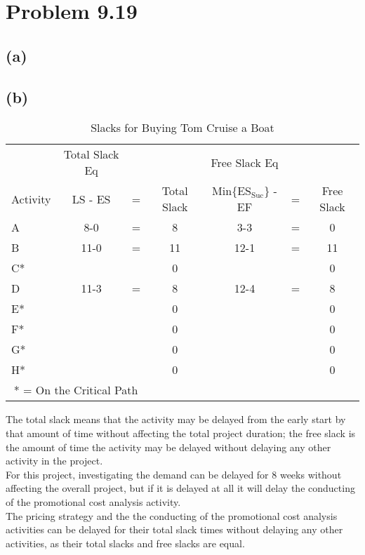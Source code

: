 \documentclass{article}
\begin{document}
	\section*{Problem 9.19}
	\subsection*{(a)}
	\begin{center}
	\makebox[\textwidth]{
		}
	\end{center}
	\pagebreak
	\subsection*{(b)}
	{\renewcommand{\arraystretch}{1.2} 
	\begin{table}[h!tbp]
  		\begin{center}
    		\caption{Slacks for Buying Tom Cruise a Boat}
    		\label{tab:table2}
			
    		\begin{tabular}{lcccccc}
				 & Total Slack Eq &  &  & Free Slack Eq & &\\
				Activity & LS - ES & = & Total Slack & Min\{ES$_{\text{Suc}}$\} - EF &= & Free Slack \\
				\hline
      			A & 8-0&= & 8 & 3-3&=& 0\\
      			B & 11-0&= & 11 & 12-1&= & 11\\
				C* && &0 &&& 0\\
				D & 11-3&= & 8 & 12-4&= & 8\\
				E* &&& 0 &&& 0\\
				F* &&& 0 &&& 0\\
				G* &&& 0 &&& 0\\
				H* &&& 0 &&& 0\\
				\hline
				\multicolumn{3}{c}{* = On the Critical Path}\\
    		\end{tabular}
  		\end{center}
	\end{table}
	}
	
	\noindent The total slack means that the activity may be delayed from the early start by that amount of time without affecting the total project duration; the free slack is the amount of time the activity may be delayed without delaying any other activity in the project.\\
	For this project, investigating the demand can be delayed for 8 weeks without affecting the overall project, but if it is delayed at all it will delay the conducting of the promotional cost analysis activity.\\
	The pricing strategy and the the conducting of the promotional cost analysis activities can be delayed for their total slack times without delaying any other activities, as their total slacks and free slacks are equal.
	
\end{document}

